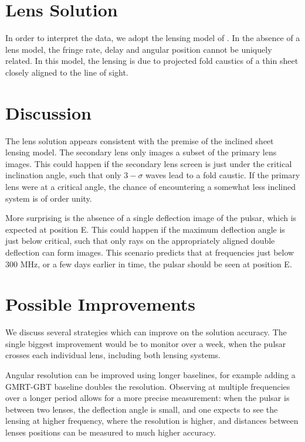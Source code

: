 \documentclass[useAMS,usenatbib]{mn2e}
\begin{document}
\section{Lens Solution}

In order to interpret the data, we adopt the lensing model of
\citet{2014MNRAS.442.3338P}.  In the absence of a lens model, the
fringe rate, delay and angular position cannot be uniquely related. In
this model, the lensing is due to projected fold caustics of a thin
sheet closely aligned to the line of sight.

\section{Discussion}

The lens solution appears consistent with the premise of the inclined
sheet lensing model\citep{2014MNRAS.442.3338P}.  The secondary lens
only images a subset of the primary lens images.  This could happen if
the secondary lens screen is just under the critical inclination
angle, such that only $3-\sigma$ waves lead to a fold caustic.  If the
primary lens were at a critical angle, the chance of encountering a
somewhat less inclined system is of order unity.

More surprising is the absence of a single deflection image of the
pulsar, which is expected at position E.  This could happen if the
maximum deflection angle is just below critical, such that only rays
on the appropriately aligned double deflection can form images.  This
scenario predicts that at frequencies just below 300 MHz, or a few
days earlier in time, the pulsar should be seen at position E.

\section{Possible Improvements}

We discuss several strategies which can improve on the solution
accuracy.  The single biggest improvement would be to monitor over a
week, when the pulsar crosses each individual lens, including both
lensing systems.

Angular resolution can be improved using longer baselines, for example
adding a GMRT-GBT baseline doubles the resolution.  Observing at
multiple frequencies over a longer period allows for a more precise
measurement: when the pulsar is between two lenses, the deflection
angle is small, and one expects to see the lensing at higher
frequency, where the resolution is higher, and distances between
lenses positions can be measured to much higher accuracy.
\end{document}
